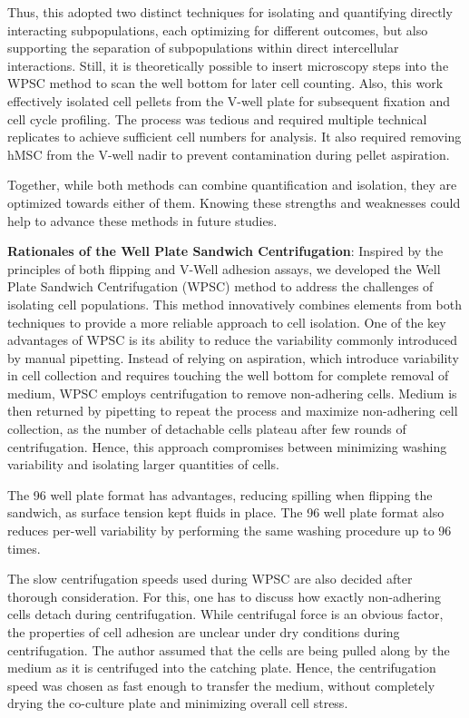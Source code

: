 \noindent Thus, this adopted two distinct techniques for isolating and
quantifying directly interacting subpopulations, each optimizing for different
outcomes, but also supporting the separation of subpopulations within direct
intercellular interactions. Still, it is theoretically possible to insert
microscopy steps into the \ac{WPSC} method to scan the well bottom for later
cell counting. Also, this work effectively isolated cell pellets from the V-well
plate for subsequent fixation and cell cycle profiling. The process was tedious
and required multiple technical replicates to achieve sufficient cell numbers
for analysis. It also required removing \ac{hMSC} from the V-well nadir to
prevent contamination during pellet aspiration.

Together, while both methods can combine quantification and isolation, they
are optimized towards either of them. Knowing these strengths and weaknesses
could help to advance these methods in future studies.





\textbf{Rationales of the Well Plate Sandwich Centrifugation}: Inspired by the
principles of both flipping and V-Well adhesion assays, we developed the Well
Plate Sandwich Centrifugation (\acf{WPSC}) method to address the challenges of
isolating cell populations. This method innovatively combines elements from both
techniques to provide a more reliable approach to cell isolation. One of the key
advantages of WPSC is its ability to reduce the variability commonly introduced
by manual pipetting. Instead of relying on aspiration, which introduce
variability in cell collection and requires touching the well bottom for
complete removal of medium, WPSC employs centrifugation to remove non-adhering
cells. Medium is then returned by pipetting to repeat the process and maximize
non-adhering cell collection, as the number of detachable cells plateau after
few rounds of centrifugation. Hence, this approach compromises
between minimizing washing variability and isolating larger quantities of cells.

The 96 well plate format has advantages, reducing spilling when flipping the
sandwich, as surface tension kept fluids in place. The 96 well plate format also
reduces per-well variability by performing the same washing procedure up to 96
times.

The slow centrifugation speeds used during \ac{WPSC} are also decided after
thorough consideration. For this, one has to discuss how exactly
non-adhering cells detach during centrifugation. While centrifugal force is an
obvious factor, the properties of cell adhesion are unclear under dry conditions
during centrifugation. The author assumed that the cells are being pulled along
by the medium as it is centrifuged into the catching plate. Hence, the centrifugation
speed was chosen as fast enough to transfer the medium, without completely
drying the co-culture plate and minimizing overall cell stress.


